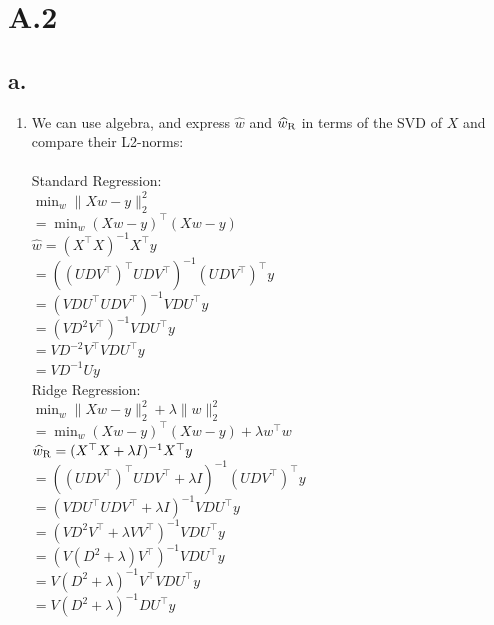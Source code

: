 \documentclass{article}
\newcommand{\1}{\mathbf{1}}
\newcommand{\twonorm}[1]{\|#1\|_2^2}
\begin{document}
\section*{A.2}
{\Large

\subsection*{a.}

\begin{enumerate}
  \item 

  We can use algebra, and express $\widehat{w}$ and $\widehat{w}_{\rm R}$ in terms of the SVD of $X$ and compare their L2-norms: \\ \\
  Standard Regression: \\
  $\min_w \twonorm{X w - y}$ \\
  $= \min_w (Xw - y)^\top(Xw-y)$ \\
  $\widehat{w} = (X^\top X)^{-1}X^\top y$ \\
  $= ((UDV^\top)^\top UDV^\top)^{-1}(UDV^\top)^\top y$ \\
  $= (VDU^\top UDV^\top)^{-1}VDU^\top y$ \\
  $= (VD^2V^\top)^{-1}VDU^\top y$ \\
  $= VD^{-2}V^\top VDU^\top y$ \\
  $= VD^{-1}U y$ \\

  Ridge Regression: \\
  $\min_w \twonorm{X w - y} + \lambda \twonorm{w}$ \\
  $= \min_w (Xw - y)^\top(Xw-y) + \lambda w^\top w$ \\
  $\widehat{w}_{\rm R} = (X^\top X + \lambda I)^{-1} X^\top y$ \\
  $= ((UDV^\top)^\top UDV^\top + \lambda I)^{-1} (UDV^\top)^\top y$ \\
  $= (VDU^\top UDV^\top + \lambda I)^{-1} VDU^\top y$ \\
  $= (VD^2V^\top + \lambda V V^\top)^{-1} VDU^\top y$ \\
  $= (V(D^2 + \lambda) V^\top)^{-1} VDU^\top y$ \\
  $= V(D^2 + \lambda)^{-1} V^\top VDU^\top y$ \\
  $= V(D^2 + \lambda)^{-1} DU^\top y$ \\


\end{enumerate}}
\end{document}
